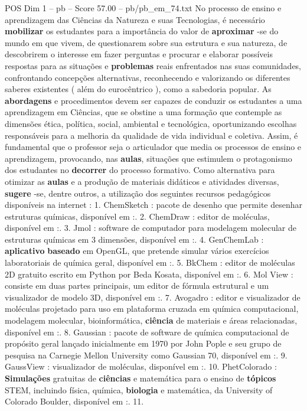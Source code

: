 \begin{textsample}{POS Dim 1 – pb – Score 57.00 – pb/pb\_em\_74.txt}
No processo de ensino e aprendizagem das Ciências da Natureza e suas Tecnologias, é necessário \textbf{mobilizar} os estudantes para a importância do valor de \textbf{aproximar} -se do mundo em que vivem, de questionarem sobre sua estrutura e sua natureza, de descobrirem o interesse em fazer perguntas e procurar e elaborar possíveis respostas para as situações e \textbf{problemas} reais enfrentados nas suas comunidades, confrontando concepções alternativas, reconhecendo e valorizando os diferentes saberes existentes ( além do eurocêntrico ), como a sabedoria popular.
As \textbf{abordagens} e procedimentos devem ser capazes de conduzir os estudantes a uma aprendizagem em Ciências, que se obstine a uma formação que contemple as dimensões ética, política, social, ambiental e tecnológica, oportunizando escolhas responsáveis para a melhoria da qualidade de vida individual e coletiva.
Assim, é fundamental que o professor seja o articulador que media os processos de ensino e aprendizagem, provocando, nas \textbf{aulas}, situações que estimulem o protagonismo dos estudantes no \textbf{decorrer} do processo formativo.
Como alternativa para otimizar as \textbf{aulas} e a produção de materiais didáticos e atividades diversas, \textbf{sugere} -se, dentre outros, a utilização dos seguintes recursos pedagógicos disponíveis na internet : 1.
ChemSketch : pacote de desenho que permite desenhar estruturas químicas, disponível em :. 2.
ChemDraw : editor de moléculas, disponível em :. 3.
Jmol : software de computador para modelagem molecular de estruturas químicas em 3 dimensões, disponível em :. 4.
GenChemLab : \textbf{aplicativo} \textbf{baseado} em OpenGL, que pretende simular vários exercícios laboratoriais de química geral, disponível em :. 5.
BkChem : editor de moléculas 2D gratuito escrito em Python por Beda Kosata, disponível em :. 6.
Mol View : consiste em duas partes principais, um editor de fórmula estrutural e um visualizador de modelo 3D, disponível em :. 7.
Avogadro : editor e visualizador de moléculas projetado para uso em plataforma cruzada em química computacional, modelagem molecular, bioinformática, \textbf{ciência} de materiais e áreas relacionadas, disponível em :. 8.
Gaussian : pacote de software de química computacional de propósito geral lançado inicialmente em 1970 por John Pople e seu grupo de pesquisa na Carnegie Mellon University como Gaussian 70, disponível em :. 9.
GaussView : visualizador de moléculas, disponível em :. 10.
PhetColorado : \textbf{Simulações} gratuitas de \textbf{ciências} e matemática para o ensino de \textbf{tópicos} STEM, incluindo física, química, \textbf{biologia} e matemática, da University of Colorado Boulder, disponível em :. 11.

\end{textsample}
